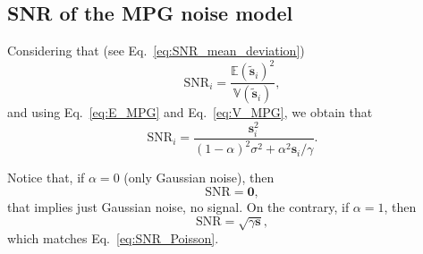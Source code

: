 \subsection{\acrshort{SNR} of the \acrshort{MPG} noise model}
Considering that (see Eq.~\ref{eq:SNR_mean_deviation})
\begin{equation}
  \text{SNR}_i = \frac{\mathbb{E}(\tilde{\mathbf{s}}_i)^2}{\mathbb{V}(\tilde{\mathbf{s}}_i)},
\end{equation}
and using Eq.~\ref{eq:E_MPG} and Eq.~\ref{eq:V_MPG}, we obtain that
\begin{equation}
  \text{SNR}_i = \frac{\mathbf{s}_i^2}{(1-\alpha)^2\sigma^2 + \alpha^2\mathbf{s}_i/\gamma}.
  \label{eq:SNR_MPG}
\end{equation}

Notice that, if $\alpha=0$ (only Gaussian noise), then
\begin{equation}
  \text{SNR} = \mathbf{0},
\end{equation}
that implies just Gaussian noise, no signal. On the contrary, if
$\alpha=1$, then
\begin{equation}
  \text{SNR} = \sqrt{\gamma\mathbf{s}},
\end{equation}
which matches Eq.~\ref{eq:SNR_Poisson}.

    

